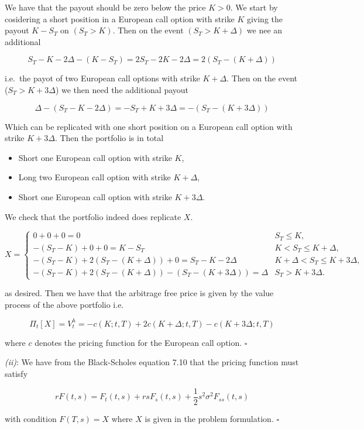 \documentclass[
]{book}
\providecommand{\tightlist}{%
  \setlength{\itemsep}{0pt}\setlength{\parskip}{0pt}}
\begin{document}
We have that the payout should be zero below the price \(K>0\). We start by cosidering a short position in a European call option with strike \(K\) giving the payout \(K-S_T\) on \((S_T>K)\). Then on the event \((S_T>K+\Delta)\) we nee an additional

\[
S_T-K-2\Delta-(K-S_T)=2S_T-2K-2\Delta=2(S_T-(K+\Delta))
\]

i.e.~the payot of two European call options with strike \(K+\Delta\). Then on the event (\(S_T>K+3\Delta\)) we then need the additional payout

\[
\Delta-(S_T-K-2\Delta)=-S_T+K+3\Delta=-(S_T-(K+3\Delta))
\]

Which can be replicated with one short position on a European call option with strike \(K+3\Delta\). Then the portfolio is in total

\begin{itemize}
\tightlist
\item
  Short one European call option with strike \(K\),
\item
  Long two European call option with strike \(K+\Delta\),
\item
  Short one European call option with strike \(K+3\Delta\).
\end{itemize}

We check that the portfolio indeed does replicate \(X\).

\[
X=\begin{cases}
0+0+0=0 & S_T\le K,\\
-(S_T-K)+0+0=K-S_T & K<S_T\le K+\Delta,\\
-(S_T-K) +2(S_T-(K+\Delta)) + 0 = S_T-K-2\Delta & K+\Delta < S_T \le K + 3\Delta,\\
-(S_T-K) +2(S_T-(K+\Delta)) - (S_T-(K+3\Delta))= \Delta& S_T>K+3\Delta.
\end{cases}
\]

as desired. Then we have that the arbitrage free price is given by the value process of the above portfolio i.e.

\[
\Pi_t[X]=V_t^h=-c(K;t,T)+2c(K+\Delta;t,T)-c(K+3\Delta;t,T)
\]

where \(c\) denotes the pricing function for the European call option. \(\square\)

\emph{(ii)}: We have from the Black-Scholes equation 7.10 that the pricing function must satisfy

\[
rF(t,s)=F_t(t,s)+rsF_s(t,s)+\frac{1}{2}s^2\sigma^2 F_{ss}(t,s)
\]

with condition \(F(T,s)=X\) where \(X\) is given in the problem formulation. \(\square\)
\end{document}
